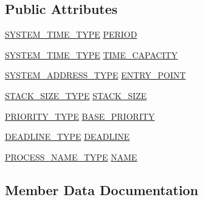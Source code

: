 \subsection*{Public Attributes}
\begin{DoxyCompactItemize}
\item 
\hyperlink{apex__types_8h_a78cd52c2621ddf2eda68fcd4bedbc1a7}{S\+Y\+S\+T\+E\+M\+\_\+\+T\+I\+M\+E\+\_\+\+T\+Y\+PE} \hyperlink{structPROCESS__ATTRIBUTE__TYPE_af571eb32c097ecf8423b40e069200d0d}{P\+E\+R\+I\+OD}
\item 
\hyperlink{apex__types_8h_a78cd52c2621ddf2eda68fcd4bedbc1a7}{S\+Y\+S\+T\+E\+M\+\_\+\+T\+I\+M\+E\+\_\+\+T\+Y\+PE} \hyperlink{structPROCESS__ATTRIBUTE__TYPE_aa3a2776010bcd8a9c21ea08013db926e}{T\+I\+M\+E\+\_\+\+C\+A\+P\+A\+C\+I\+TY}
\item 
\hyperlink{apex__types_8h_afad87659fcb2bad73146a13b260290b9}{S\+Y\+S\+T\+E\+M\+\_\+\+A\+D\+D\+R\+E\+S\+S\+\_\+\+T\+Y\+PE} \hyperlink{structPROCESS__ATTRIBUTE__TYPE_a114dee662eb2d6aa73c01cba161ff9cf}{E\+N\+T\+R\+Y\+\_\+\+P\+O\+I\+NT}
\item 
\hyperlink{apex__process_8h_a88a1e60035e9edf9ff430765543659b2}{S\+T\+A\+C\+K\+\_\+\+S\+I\+Z\+E\+\_\+\+T\+Y\+PE} \hyperlink{structPROCESS__ATTRIBUTE__TYPE_a840fae988efaf861b2ca2ac27fbf1339}{S\+T\+A\+C\+K\+\_\+\+S\+I\+ZE}
\item 
\hyperlink{apex__process_8h_a2185443fe5bfda31ff9cce2071f1b18c}{P\+R\+I\+O\+R\+I\+T\+Y\+\_\+\+T\+Y\+PE} \hyperlink{structPROCESS__ATTRIBUTE__TYPE_ae964c35a6c5d325d3070ec54dc4c0cb0}{B\+A\+S\+E\+\_\+\+P\+R\+I\+O\+R\+I\+TY}
\item 
\hyperlink{apex__process_8h_a930759cec98a9372ee6b92c4c20223fe}{D\+E\+A\+D\+L\+I\+N\+E\+\_\+\+T\+Y\+PE} \hyperlink{structPROCESS__ATTRIBUTE__TYPE_afc0e1313a66a458071d58be90d818eae}{D\+E\+A\+D\+L\+I\+NE}
\item 
\hyperlink{apex__process_8h_a50887e4c49611fad19176906f38db47c}{P\+R\+O\+C\+E\+S\+S\+\_\+\+N\+A\+M\+E\+\_\+\+T\+Y\+PE} \hyperlink{structPROCESS__ATTRIBUTE__TYPE_afe04bf9682eabb1bcca2a2059ce97cee}{N\+A\+ME}
\end{DoxyCompactItemize}


\subsection{Member Data Documentation}
